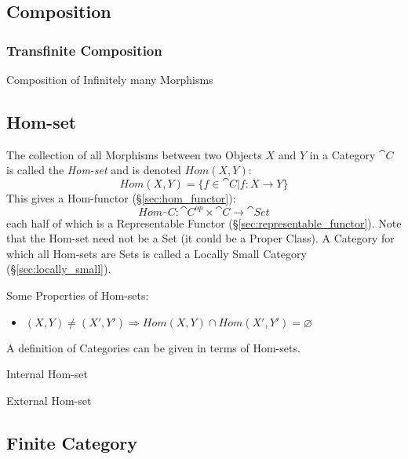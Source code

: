 \subsection{Composition}\label{sec:composition}

\subsubsection{Transfinite Composition}
\label{sec:transfinite_composition}

Composition of Infinitely many Morphisms



\subsection{Hom-set}\label{sec:hom_set}

The collection of all Morphisms between two Objects $X$ and $Y$ in a
Category $\cat{C}$ is called the \emph{Hom-set} and is denoted
$Hom(X,Y)$:
\[
  Hom(X,Y) = \{f \in \cat{C} | f : X \rightarrow Y\}
\]
This gives a Hom-functor (\S\ref{sec:hom_functor}):
\[
  Hom_\cat{C} : \cat{C^{op}} \times \cat{C} \rightarrow \cat{Set}
\]
each half of which is a Representable Functor
(\S\ref{sec:representable_functor}).
\newline
\fist Note that the Hom-set need not be a Set (it could be a
Proper Class). A Category for which all Hom-sets are Sets is called a
Locally Small Category (\S\ref{sec:locally_small}).

Some Properties of Hom-sets:
\begin{itemize}
\item $ (X,Y) \neq (X',Y') \Rightarrow
  Hom(X,Y) \cap Hom(X',Y') = \varnothing$
\end{itemize}

A definition of Categories can be given in terms of Hom-sets. %

Internal Hom-set

External Hom-set



\subsection{Finite Category}\label{sec:finite_category}

